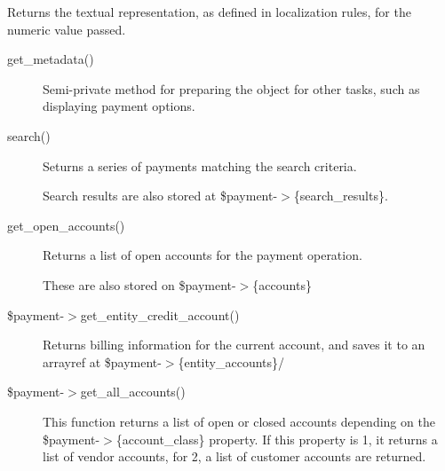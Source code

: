 \begin{description}
\begin{description}
\begin{description}
\begin{description}
\begin{description}
\begin{description}
\begin{description}
\begin{description}
\begin{description}
\begin{description}
Returns the textual representation, as defined in localization rules, for the
numeric value passed.

\end{description}
\begin{description}

\item[{get\_metadata()}] \mbox{}

Semi-private method for preparing the object for other tasks, such as displaying
payment options.

\end{description}
\begin{description}

\item[{search()}] \mbox{}

Seturns a series of payments matching the search criteria.



Search results are also stored at \$payment-$>$\{search\_results\}.

\end{description}
\begin{description}

\item[{get\_open\_accounts()}] \mbox{}

Returns a list of open accounts for the payment operation.



These are also stored on \$payment-$>$\{accounts\}

\end{description}
\begin{description}

\item[{\$payment-$>$get\_entity\_credit\_account()}] \mbox{}

Returns billing information for the current account, and saves it to an arrayref
at \$payment-$>$\{entity\_accounts\}/

\end{description}
\begin{description}

\item[{\$payment-$>$get\_all\_accounts()}] \mbox{}

This function returns a list of open or closed accounts depending on the 
\$payment-$>$\{account\_class\} property.  If this property is 1, it returns a list 
of vendor accounts, for 2, a list of customer accounts are returned.




\end{description}
\end{description}
\end{description}
\end{description}
\end{description}
\end{description}
\end{description}
\end{description}
\end{description}
\end{description}
